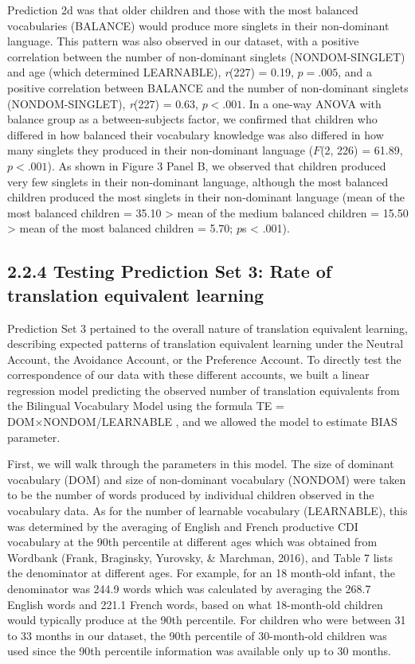 \documentclass[
  english,
  ,man,floatsintext]{apa6}
\begin{document}
Prediction 2d was that older children and those with the most balanced vocabularies (BALANCE) would produce more singlets in their non-dominant language. This pattern was also observed in our dataset, with a positive correlation between the number of non-dominant singlets (NONDOM-SINGLET) and age (which determined LEARNABLE), \emph{r}(227) = 0.19, \(p = .005\), and a positive correlation between BALANCE and the number of non-dominant singlets (NONDOM-SINGLET), \emph{r}(227) = 0.63, \(p < .001\). In a one-way ANOVA with balance group as a between-subjects factor, we confirmed that children who differed in how balanced their vocabulary knowledge was also differed in how many singlets they produced in their non-dominant language (\(F\)(2, 226) = 61.89, \(p < .001\)). As shown in Figure 3 Panel B, we observed that children produced very few singlets in their non-dominant language, although the most balanced children produced the most singlets in their non-dominant language (mean of the most balanced children = 35.10 \textgreater{} mean of the medium balanced children = 15.50 \textgreater{} mean of the most balanced children = 5.70; \(p\)s \textless{} .001).

\hypertarget{testing-prediction-set-3-rate-of-translation-equivalent-learning}{%
\subsection{2.2.4 Testing Prediction Set 3: Rate of translation equivalent learning}\label{testing-prediction-set-3-rate-of-translation-equivalent-learning}}

Prediction Set 3 pertained to the overall nature of translation equivalent learning, describing expected patterns of translation equivalent learning under the Neutral Account, the Avoidance Account, or the Preference Account. To directly test the correspondence of our data with these different accounts, we built a linear regression model predicting the observed number of translation equivalents from the Bilingual Vocabulary Model using the formula TE = DOM×NONDOM/LEARNABLE , and we allowed the model to estimate BIAS parameter.

First, we will walk through the parameters in this model. The size of dominant vocabulary (DOM) and size of non-dominant vocabulary (NONDOM) were taken to be the number of words produced by individual children observed in the vocabulary data. As for the number of learnable vocabulary (LEARNABLE), this was determined by the averaging of English and French productive CDI vocabulary at the 90th percentile at different ages which was obtained from Wordbank (Frank, Braginsky, Yurovsky, \& Marchman, 2016), and Table 7 lists the denominator at different ages. For example, for an 18 month-old infant, the denominator was 244.9 words which was calculated by averaging the 268.7 English words and 221.1 French words, based on what 18-month-old children would typically produce at the 90th percentile. For children who were between 31 to 33 months in our dataset, the 90th percentile of 30-month-old children was used since the 90th percentile information was available only up to 30 months.
\end{document}
